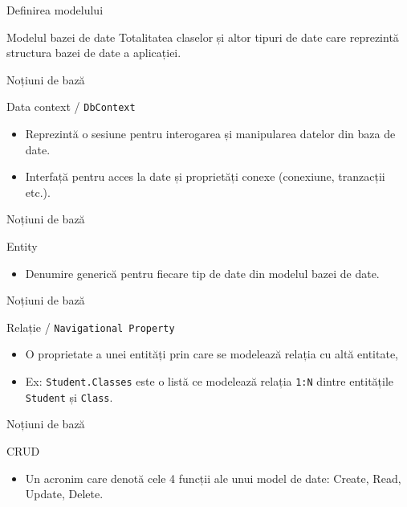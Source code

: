 \documentclass[presentation]{beamer}
\begin{document}
\begin{frame}[label={sec:orgd6c63ad}]{Definirea modelului}
\begin{block}{Modelul bazei de date}
Totalitatea claselor și altor tipuri de date care reprezintă structura bazei de date a aplicației.
\end{block}
\end{frame}
\begin{frame}[label={sec:org4bf7362},fragile]{Noțiuni de bază}
 \begin{block}{Data context / \texttt{DbContext}}
\begin{itemize}
\item Reprezintă o sesiune pentru interogarea și manipularea datelor din baza de date.
\item Interfață pentru acces la date și proprietăți conexe (conexiune, tranzacții etc.).
\end{itemize}
\end{block}
\end{frame}
\begin{frame}[label={sec:org93cab3f}]{Noțiuni de bază}
\begin{block}{Entity}
\begin{itemize}
\item Denumire generică pentru fiecare tip de date din modelul bazei de date.
\end{itemize}
\end{block}
\end{frame}
\begin{frame}[label={sec:orgd94e094},fragile]{Noțiuni de bază}
 \begin{block}{Relație / \texttt{Navigational Property}}
\begin{itemize}
\item O proprietate a unei entități prin care se modelează relația cu altă entitate,
\item Ex: \texttt{Student.Classes} este o listă ce modelează relația \texttt{1:N} dintre entitățile \texttt{Student} și \texttt{Class}.
\end{itemize}
\end{block}
\end{frame}
\begin{frame}[label={sec:org90ccc0e}]{Noțiuni de bază}
\begin{block}{CRUD}
\begin{itemize}
\item Un acronim care denotă cele 4 funcții ale unui model de date: \alert{Create}, \alert{Read}, \alert{Update}, \alert{Delete}.
\end{itemize}
\end{block}
\end{frame}
\end{document}
